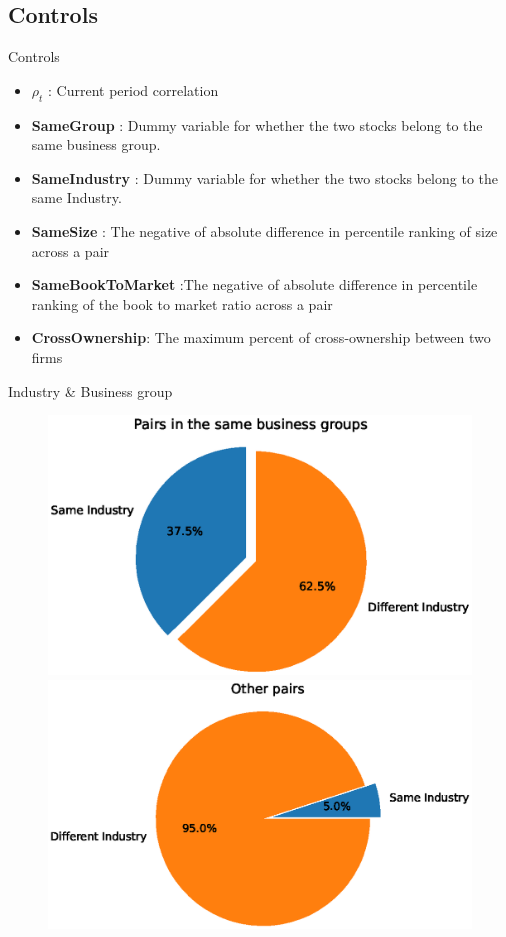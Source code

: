 \documentclass{beamer}
\begin{document}
	\subsection{Controls}
	\begin{frame}{Controls}
		\begin{itemize}
			\item $ \rho_{t} $ : Current period correlation
			
			\item \textbf{SameGroup} : Dummy variable for whether the two stocks belong to the same business group.
			
			
			\item \textbf{SameIndustry} : Dummy variable for whether the two stocks belong to the same Industry.
			
			\item \textbf{SameSize} : The negative of absolute difference in percentile ranking of size across a pair
			
			\item \textbf{SameBookToMarket} :The negative of absolute difference in percentile ranking of the book to market ratio across a pair
			
			\item \textbf{CrossOwnership}: The maximum percent of cross-ownership between two firms
		\end{itemize}
	\end{frame}
	
	
	
	\begin{frame}{Industry \& Business group}
				\begin{table}[htbp]
			\centering \scriptsize
			{
				
			}
		\end{table}
		\begin{figure}[htbp]
			\includegraphics[width=0.45\linewidth]{Output/sameIndustryinBG.eps}
			\includegraphics[width=0.45\linewidth]{Output/sameIndustryNoinBG.eps}
			
		\end{figure}
	\end{frame}
	
\end{document}
